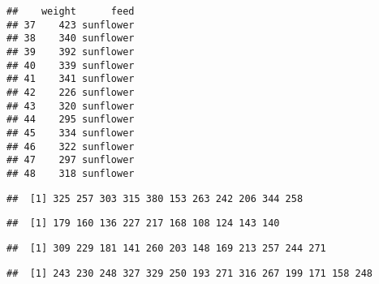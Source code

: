\documentclass[
]{article}
\newenvironment{Shaded}{\begin{snugshade}}{\end{snugshade}}
\newcommand{\NormalTok}[1]{#1}
\newcommand{\OtherTok}[1]{\textcolor[rgb]{0.56,0.35,0.01}{#1}}
\newcommand{\SpecialCharTok}[1]{\textcolor[rgb]{0.00,0.00,0.00}{#1}}
\newcommand{\StringTok}[1]{\textcolor[rgb]{0.31,0.60,0.02}{#1}}
\begin{document}
\begin{Shaded}
\end{Shaded}

\begin{verbatim}
##    weight      feed
## 37    423 sunflower
## 38    340 sunflower
## 39    392 sunflower
## 40    339 sunflower
## 41    341 sunflower
## 42    226 sunflower
## 43    320 sunflower
## 44    295 sunflower
## 45    334 sunflower
## 46    322 sunflower
## 47    297 sunflower
## 48    318 sunflower
\end{verbatim}

\begin{verbatim}
##  [1] 325 257 303 315 380 153 263 242 206 344 258
\end{verbatim}

\begin{verbatim}
##  [1] 179 160 136 227 217 168 108 124 143 140
\end{verbatim}

\begin{verbatim}
##  [1] 309 229 181 141 260 203 148 169 213 257 244 271
\end{verbatim}

\begin{verbatim}
##  [1] 243 230 248 327 329 250 193 271 316 267 199 171 158 248
\end{verbatim}
\end{document}
